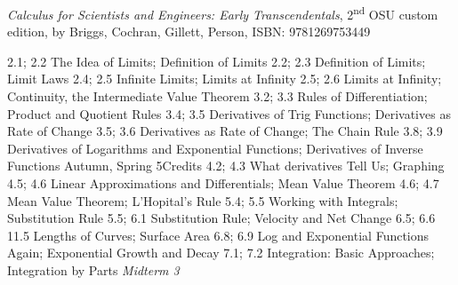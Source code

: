 \documentclass{osucourse}
\begin{document}
\CatalogDescription
\PrerequisitesAndExclusions

\begin{Text}
\emph{Calculus for Scientists and Engineers: Early Transcendentals}, 2\textsuperscript{nd} OSU custom edition, by Briggs, Cochran, Gillett, Person, ISBN: 9781269753449
\end{Text}

\begin{TopicsOutline}
2.1; 2.2       The Idea of Limits; Definition of Limits
2.2; 2.3       Definition of Limits; Limit Laws
2.4; 2.5       Infinite Limits; Limits at Infinity
2.5; 2.6       Limits at Infinity; Continuity, the Intermediate Value Theorem
3.2; 3.3       Rules of Differentiation; Product and Quotient Rules
3.4; 3.5       Derivatives of Trig Functions; Derivatives as Rate of Change
3.5; 3.6       Derivatives as Rate of Change; The Chain Rule
3.8; 3.9        Derivatives of Logarithms and Exponential Functions; Derivatives of Inverse Functions                                     Autumn, Spring                5Credits
4.2; 4.3        What derivatives Tell Us; Graphing
4.5; 4.6        Linear Approximations and Differentials; Mean Value Theorem
4.6; 4.7        Mean Value Theorem; L'Hopital's Rule
5.4; 5.5        Working with Integrals; Substitution Rule
5.5; 6.1        Substitution Rule; Velocity and Net Change
6.5; 6.6 11.5   Lengths of Curves; Surface Area
6.8; 6.9        Log and Exponential Functions Again; Exponential Growth and Decay
7.1; 7.2        Integration: Basic Approaches; Integration by Parts \emph{Midterm 3}
\end{TopicsOutline}
\end{document}
